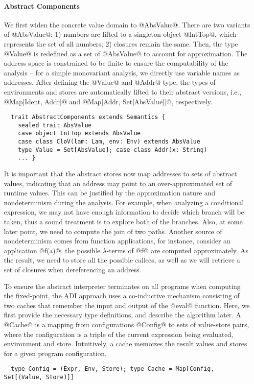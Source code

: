 \paragraph{Abstract Components}

We first widen the concrete value domain to @AbsValue@. There are two variants of
@AbsValue@: 1) numbers are lifted to a singleton object @IntTop@, which represents
the set of all numbers; 2) closures remain the same. Then, the type @Value@ is
redefined as a set of @AbsValue@ to account for approximation.  The address
space is constrained to be finite to ensure the computability of the analysis --
for a simple monovariant analysis, we directly use variable names as
addresses. After defining the @Value@ and @Addr@ type, the types of
environments and stores are automatically lifted to their abstract versions,
i.e., @Map[Ident, Addr]@ and @Map[Addr, Set[AbsValue]]@, respectively.  
\begin{lstlisting}
  trait AbstractComponents extends Semantics {
    sealed trait AbsValue
    case object IntTop extends AbsValue
    case class CloV(lam: Lam, env: Env) extends AbsValue
    type Value = Set[AbsValue]; case class Addr(x: String)
    ... }
\end{lstlisting}

It is important that the abstract stores now map addresses to sets of abstract
values, indicating that an address may point to an over-approximated set of
runtime values.  This can be justified by the approximation nature and
nondeterminism during the analysis.  For example, when analyzing a
conditional expression, we may not have enough information to decide which
branch will be taken, thus a sound treatment is to explore both of the branches.
Also, at some later point, we need to compute the join of two paths.  Another
source of nondeterminism comes from function applications, for instance,
consider an application @f(a)@, the possible $\lambda$-terms of @f@ are
computed approximately.  As the result, we need to store all the possible
callees, as well as we will retrieve a set of closures when dereferencing an
address. 

To ensure the abstract interpreter terminates on all programs when computing
the fixed-point, the ADI approach uses a co-inductive mechanism consisting of
two caches that remember the input and output of the @eval@ function.
Here, we first provide the necessary type definitions, and describe
the algorithm later. A @Cache@ is a mapping from configurations @Config@ to
sets of value-store pairs, where the configuration is a triple of the current
expression being evaluated, environment and store. Intuitively, a cache memoizes
the result values and stores for a given program configuration.
\begin{lstlisting}
  type Config = (Expr, Env, Store); type Cache = Map[Config, Set[(Value, Store)]]
\end{lstlisting}

